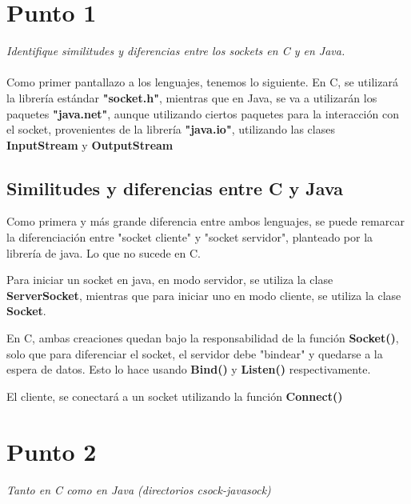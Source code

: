 \documentclass[12pt,journal,compsoc]{IEEEtran}
\begin{document}
%
\IEEEpeerreviewmaketitle



\section{Punto 1}
\textit{Identifique similitudes y diferencias entre los sockets en C y en Java.}\\\\
Como primer pantallazo a los lenguajes, tenemos lo siguiente.
En C, se utilizará la librería estándar \textbf{"socket.h"}, mientras que en Java,
se va a utilizarán los paquetes \textbf{"java.net"}, aunque utilizando ciertos
paquetes para la interacción con el socket, provenientes de la librería
\textbf{"java.io"}, utilizando las clases \textbf{InputStream} y \textbf{OutputStream}

\subsection{Similitudes y diferencias entre C y Java}
Como primera y más grande diferencia entre ambos lenguajes, se puede remarcar la diferenciación
entre "socket cliente" y "socket servidor", planteado por la librería de java. Lo que no sucede en C.

Para iniciar un socket en java, en modo servidor, se utiliza la clase \textbf{ServerSocket}, mientras que para iniciar uno en modo cliente, se utiliza la clase \textbf{Socket}.

En C, ambas creaciones quedan bajo la responsabilidad de la función \textbf{Socket()}, solo que para diferenciar el socket, el servidor debe "bindear" y quedarse a la espera de datos. Esto lo hace usando \textbf{Bind()} y \textbf{Listen()} respectivamente.

El cliente, se conectará a un socket utilizando la función \textbf{Connect()}

\section{Punto 2}
\textit{Tanto en C como en Java (directorios csock-javasock)}
\end{document}
